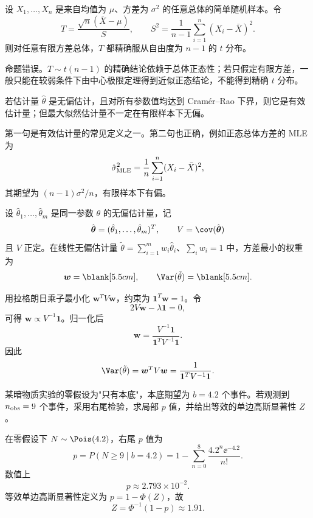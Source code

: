 
\begin{question}[判断题]
设 $X_1,\ldots,X_n$ 是来自均值为 $\mu$、方差为 $\sigma^2$ 的任意总体的简单随机样本。令
\[
T=\frac{\sqrt n(\bar X-\mu)}{S},\qquad
S^2=\frac1{n-1}\sum_{i=1}^n(X_i-\bar X)^2.
\]
则对任意有限方差总体，$T$ 都精确服从自由度为 $n-1$ 的 $t$ 分布。
\begin{solution}
命题错误。$T\sim t(n-1)$ 的精确结论依赖于总体正态性；若只假定有限方差，一般只能在较弱条件下由中心极限定理得到近似正态结论，不能得到精确 $t$ 分布。
\end{solution}
\end{question}

\begin{question}[判断题]
若估计量 $\hat\theta$ 是无偏估计，且对所有参数值均达到 Cram\'er--Rao 下界，则它是有效估计量；但最大似然估计量不一定在有限样本下无偏。
\begin{solution}
第一句是有效估计量的常见定义之一。第二句也正确，例如正态总体方差的 MLE 为
\[
\hat\sigma^2_{\rm MLE}=\frac1n\sum_{i=1}^n(X_i-\bar X)^2,
\]
其期望为 $(n-1)\sigma^2/n$，有限样本下有偏。
\end{solution}
\end{question}

\begin{question}[填空题]
设 $\hat\theta_1,\ldots,\hat\theta_m$ 是同一参数 $\theta$ 的无偏估计量，记
\[
\hat{\boldsymbol\theta}=(\hat\theta_1,\ldots,\hat\theta_m)^T,
\qquad
V=\cov(\hat{\boldsymbol\theta})
\]
且 $V$ 正定。在线性无偏估计量 $\tilde\theta=\sum_{i=1}^m w_i\hat\theta_i$、$\sum_iw_i=1$ 中，方差最小的权重为
\[
\boldsymbol w=\blank[5.5cm],\qquad
\Var(\tilde\theta)=\blank[5.5cm].
\]
\begin{solution}
用拉格朗日乘子最小化 $\boldsymbol w^TV\boldsymbol w$，约束为 $\mathbf1^T\boldsymbol w=1$。令
\[
2V\boldsymbol w-\lambda\mathbf1=0,
\]
可得 $\boldsymbol w\propto V^{-1}\mathbf1$。归一化后
\[
\boldsymbol w=\frac{V^{-1}\mathbf1}{\mathbf1^TV^{-1}\mathbf1}.
\]
因此
\[
\Var(\tilde\theta)=\boldsymbol w^TV\boldsymbol w
=\frac1{\mathbf1^TV^{-1}\mathbf1}.
\]

\end{solution}
\end{question}

\begin{question}
某暗物质实验的零假设为"只有本底"，本底期望为 $b=4.2$ 个事件。若观测到 $n_{\rm obs}=9$ 个事件，采用右尾检验，求局部 $p$ 值，并给出等效的单边高斯显著性 $Z$。
\begin{solution}
在零假设下 $N\sim\Pois(4.2)$，右尾 $p$ 值为
\[
p=P(N\ge 9\mid b=4.2)
=1-\sum_{n=0}^{8}\frac{4.2^n\ee^{-4.2}}{n!}.
\]
数值上
\[
p\approx 2.793\times10^{-2}.
\]
等效单边高斯显著性定义为 $p=1-\Phi(Z)$，故
\[
Z=\Phi^{-1}(1-p)\approx 1.91.
\]
\end{solution}
\end{question}

